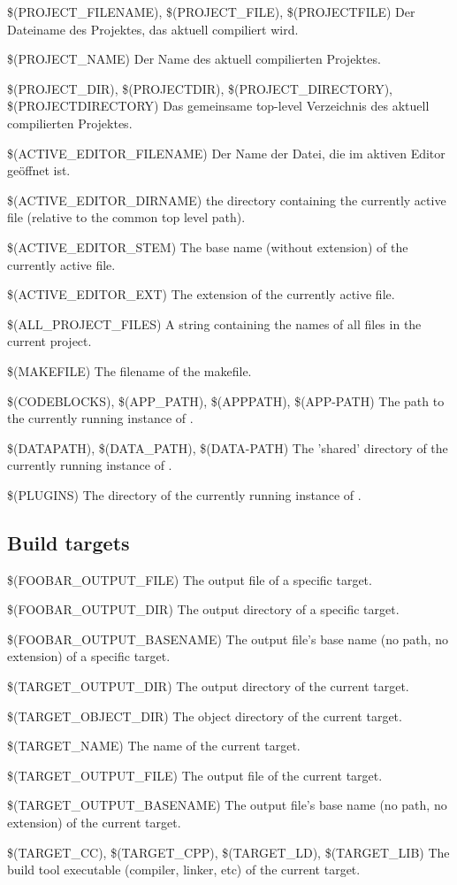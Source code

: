 \begin{codeentry}
\item[\$(PROJECT\_FILENAME), \$(PROJECT\_FILE), \$(PROJECTFILE)] Der Dateiname des Projektes, das aktuell compiliert wird.
\item[\$(PROJECT\_NAME)] Der Name des aktuell compilierten Projektes.
\item[\$(PROJECT\_DIR), \$(PROJECTDIR), \$(PROJECT\_DIRECTORY), \$(PROJECTDIRECTORY)] Das gemeinsame top-level Verzeichnis des aktuell compilierten Projektes.
\item[\$(ACTIVE\_EDITOR\_FILENAME)] Der Name der Datei, die im aktiven Editor geöffnet ist.
\item[\$(ACTIVE\_EDITOR\_DIRNAME)] the directory containing the currently active file (relative to the common top level path).
\item[\$(ACTIVE\_EDITOR\_STEM)] The base name (without extension) of the currently active file.
\item[\$(ACTIVE\_EDITOR\_EXT)] The extension of the currently active file.
\item[\$(ALL\_PROJECT\_FILES)] A string containing the names of all files in the current project.
\item[\$(MAKEFILE)] The filename of the makefile.
\item[\$(CODEBLOCKS), \$(APP\_PATH), \$(APPPATH), \$(APP-PATH)] The path to the currently running instance of \codeblocks.
\item[\$(DATAPATH), \$(DATA\_PATH), \$(DATA-PATH)] The 'shared' directory of the currently running instance of \codeblocks.
\item[\$(PLUGINS)] The  directory of the currently running instance of \codeblocks.
\end{codeentry}

\subsection{Build targets}

\begin{codeentry}
\item[\$(FOOBAR\_OUTPUT\_FILE)] The output file of a specific target.
\item[\$(FOOBAR\_OUTPUT\_DIR)] The output directory of a specific target.
\item[\$(FOOBAR\_OUTPUT\_BASENAME)] The output file's base name (no path, no extension) of a specific target.
\item[\$(TARGET\_OUTPUT\_DIR)] The output directory of the current target.
\item[\$(TARGET\_OBJECT\_DIR)] The object directory of the current target.
\item[\$(TARGET\_NAME)] The name of the current target.
\item[\$(TARGET\_OUTPUT\_FILE)] The output file of the current target.
\item[\$(TARGET\_OUTPUT\_BASENAME)] The output file's base name (no path, no extension) of the current target.
\item[\$(TARGET\_CC), \$(TARGET\_CPP), \$(TARGET\_LD), \$(TARGET\_LIB)] The build tool executable (compiler, linker, etc) of the current target.
\end{codeentry}

